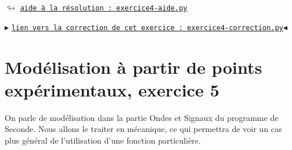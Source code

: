 \documentclass[11pt]{article}
\begin{document}
 \medskip
 


\begin{center}
 $\looparrowright$ \href{https://github.com/formationPythonPC-Juin/aides-formation/blob/master/exercice4-aide.py}{\underline{\texttt{aide à la résolution : exercice4-aide.py}}}
\end{center}


\medskip


\begin{center}
$\blacktriangleright$ \href{https://github.com/formationPythonPC-Juin/corrections-formation/blob/master/exercice4-correction.py}{\underline{\texttt{lien vers la correction de cet exercice : exercice4-correction.py}}}$\blacktriangleleft$                                                                                                                                                                    \end{center}


 

 
 \newpage
 
 
 \section{Modélisation à partir de points expérimentaux, exercice 5}

 
 \medskip
 On parle de modélisation dans la partie Ondes et Signaux du programme de Seconde. Nous allons le traiter en mécanique, ce qui permettra de voir un cas plus général de l'utilisation d'une fonction particulière.
 
\end{document}
